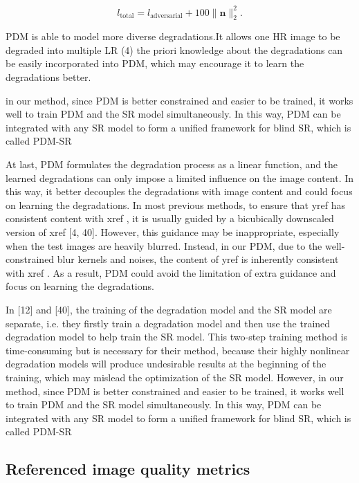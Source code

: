             \begin{equation}
                l_{\text{total}} = l_{\text{adversarial}} + 100 \|\mathbf{n}\|_2^2.
            \end{equation}

            PDM is able to model more diverse degradations.It allows one HR image to be degraded into multiple LR (4)
            the priori knowledge about the degradations can be easily incorporated into PDM, which may encourage it to learn the degradations better.

            in our method, since PDM is better constrained and easier to be trained, it works well to train PDM and the SR model simultaneously. In this way, PDM can be integrated with any SR model to form a unified framework for blind SR, which is called PDM-SR

            At last, PDM formulates the degradation process as a linear function, and the learned degradations can only impose a limited influence on the image content.
            In this way, it better decouples the degradations with image content and could focus on learning the degradations.
            In most previous methods, to ensure that yref has consistent content with xref , it is usually guided by a bicubically downscaled version of xref [4, 40].
            However, this guidance may be inappropriate, especially when the test images are heavily blurred. 
            Instead, in our PDM, due to the well-constrained blur kernels and noises, the content of yref is inherently consistent with xref .
            As a result, PDM could avoid the limitation of extra guidance and focus on learning the degradations.
            
            In [12] and [40], the training of the degradation model and the SR model are separate, i.e. they firstly train a degradation model and then use the trained degradation model to help train the SR model.
            This two-step training method is time-consuming but is necessary for their method, because their highly nonlinear degradation models will produce undesirable results at the beginning of the training, which may mislead the optimization of the SR model.
            However, in our method, since PDM is better constrained and easier to be trained, it works well to train PDM and the SR model simultaneously. In this way, PDM can be integrated with any SR model to form a unified framework for blind SR, which is called PDM-SR

    \subsection{Referenced image quality metrics}

